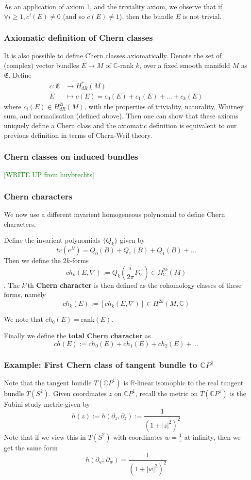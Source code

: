 \documentclass[a4paper]{article}
\theoremstyle{definition} \newtheorem*{definition}{Definition}
\theoremstyle{definition} \newtheorem*{definitions}{Definitions}
\theoremstyle{plain} \newtheorem{theorem}{Theorem}[section]
\theoremstyle{plain} \newtheorem{proposition}[theorem]{Proposition}
\theoremstyle{plain} \newtheorem{corollary}[theorem]{Corollary}
\theoremstyle{plain} \newtheorem{lemma}[theorem]{Lemma}
\theoremstyle{plain} \newtheorem{example}[theorem]{Example}
\newcommand{\finish}[1]{\textcolor{green}{#1}}
\newcommand{\defn}[1]{\textbf{#1}}
\newcommand{\realnos}{\mathbb{R}}
\newcommand{\complexnos}{\mathbb{C}}
\begin{document}
As an application of axiom 1, and the triviality axiom, we observe that if $\forall i\geq 1, c^i(E)\neq 0$ (and so $c(E)\neq 1$), then the bundle $E$ is not trivial. 

\subsubsection{Axiomatic definition of Chern classes}
It is also possible to define Chern classes axiomatically. Denote the set of (complex) vector bundles $E\to M$ of $\complexnos$-rank $k$, over a fixed smooth manifold $M$ as $\mathfrak{E}$. Define
\begin{align*}
    c: \mathfrak{E} & \to H^*_{dR}(M) \\
    E & \mapsto c(E) = c_0(E)+c_1(E)+\ldots +c_k(E)
\end{align*}
where $c_i(E)\in H^{2i}_{dR}(M)$, with the properties of triviality, naturality, Whitney sum, and normailsation (defined above). Then one can show that these axioms uniquely define a Chern class and the axiomatic definition is equivalent to our previous definition in terms of Chern-Weil theory. 

\subsubsection{Chern classes on induced bundles}
\finish{[WRITE UP from huybrechts]}

\subsubsection{Chern characters}
We now use a different invarient homogeneous polynomial to define Chern characters. 

Define the invarient polynomials $\{Q_k\}$ given by 
$$tr(e^B)=Q_0(B)+Q_1(B)+Q_1(B)+\ldots $$
Then we define the $2k$-forms 
$$ch_k(E,\nabla):=Q_k \left( \frac{i}{2\pi}F_\nabla \right) \in \Omega^{2k}_\complexnos (M)$$.
The $k$'th \defn{Chern character} is then defined as the cohomology classes of these forms, namely
$$ch_k(E):= [ch_k(E, \nabla)]\in H^{2k}(M, \complexnos)$$

We note that $ch_0(E)=\text{rank}(E)$.

Finally we define the \defn{total Chern character} as 
$$ch(E):=ch_0(E)+ch_1(E)+ch_2(E)+\ldots$$

\subsubsection{Example: First Chern class of tangent bundle to $\complexnos P^1$}
Note that the tangent bundle $T(\complexnos P^1)$ is $\realnos$-linear isomophic to the real tangent bundle $T(S^2)$. Given coordinates $z$ on $\complexnos P^1$, recall the metric on $T(\complexnos P^1)$ is the Fubini-study metric given by
$$h(z):= h(\partial_z, \partial_z) := \frac{1}{(1+|z|^2)^2}$$
Note that if we view this in $T(S^2)$ with coordinates $w=\frac{1}{z}$ at infinity, then we get the same form 
$$h(\partial_w, \partial_w)=\frac{1}{(1+|w|^2)^2}$$
\end{document}
